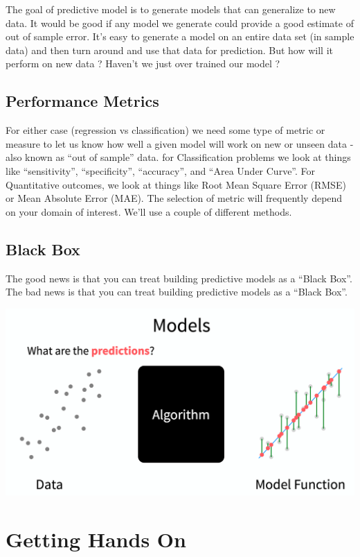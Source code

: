 \documentclass[
]{book}
\begin{document}
The goal of predictive model is to generate models that can generalize to new data. It would be good if any model we generate could provide a good estimate of out of sample error. It's easy to generate a model on an entire data set (in sample data) and then turn around and use that data for prediction. But how will it perform on new data ? Haven't we just over trained our model ?

\hypertarget{performance-metrics}{%
\section{Performance Metrics}\label{performance-metrics}}

For either case (regression vs classification) we need some type of metric or measure to let us know how well a given model will work on new or unseen data - also known as ``out of sample'' data. for Classification problems we look at things like ``sensitivity'', ``specificity'', ``accuracy'', and ``Area Under Curve''. For Quantitative outcomes, we look at things like Root Mean Square Error (RMSE) or Mean Absolute Error (MAE). The selection of metric will frequently depend on your domain of interest. We'll use a couple of different methods.

\hypertarget{black-box}{%
\section{Black Box}\label{black-box}}

The good news is that you can treat building predictive models as a ``Black Box''.
The bad news is that you can treat building predictive models as a ``Black Box''.

\includegraphics{./PICS/black_box.png}

\hypertarget{getting-hands-on}{%
\chapter{Getting Hands On}\label{getting-hands-on}}
\end{document}
